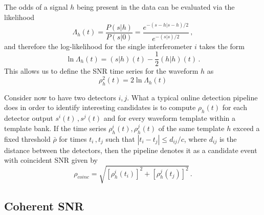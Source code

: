 \documentclass[aps, prd, twocolumn, superscriptaddress, nofootinbib]{revtex4-1}
\begin{document}
The odds of a signal $h$ being present in the data can be evaluated via the likelihood
\begin{equation}
\Lambda_h(t)=\frac{P(s|h)}{P(s|0)}=\frac{e^{-(s-h|s-h)/2}}{e^{-(s|s)/2}}\, ,
\end{equation}
 and therefore the log-likelihood  for the single interferometer $i$ takes the form
 \begin{equation}\label{Lambda}
 \ln\Lambda_h(t)=(s|h)(t)-\frac{1}{2}(h|h)(t)\, .
 \end{equation}
This allows us to define the SNR time series for the waveform $h$ as
\begin{equation}
\rho_h^2(t)=2\ln\Lambda_h(t)
\end{equation}

Consider now to have two detectors $i,j$. What a typical online detection pipeline does in order to identify interesting candidates is to compute $\rho_h(t)$ for each detector output $s^i(t)\, ,s^j(t)$ and for every waveform template within a template bank. If the time series $\rho^i_h(t),\rho^j_h(t)$ of the same template $h$ exceed a fixed threshold  $\bar{\rho}$ for times $t_i\, ,t_j$ such that $|t_i-t_j|\leq d_{ij}/c$, where $d_{ij}$ is the distance between the detectors, then the pipeline denotes it as a candidate event with coincident SNR given by
\begin{equation}
\rho_{coinc}=\sqrt{[\rho^i_h(t_i)]^2+[\rho^j_h(t_j)]^2}\, .
\end{equation}

\subsection{Coherent SNR}
\end{document}
